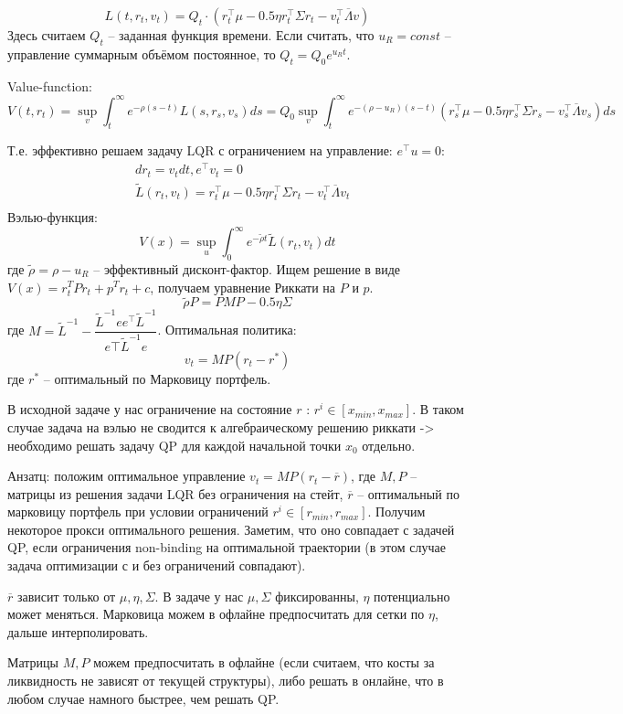 \documentclass[12pt,a4paper]{article}
\begin{document}
$$L(t, r_t, v_t) = Q_t \cdot 
\left( r_t^\top \mu - 0.5 \eta r_t^\top \Sigma r_t - v_t^\top \overline{\Lambda} v \right)$$
Здесь считаем $Q_t$ -- заданная функция времени. Если считать, что $u_R = const$ -- управление суммарным объёмом постоянное, то
$Q_t = Q_0 e^{u_R t}$. 

Value-function:
$$
    V(t, r_t) = \sup_{v} \int_t^\infty e^{-\rho(s-t)} L(s, r_s, v_s) ds
    = Q_0 \sup_{v} \int_t^\infty e^{-(\rho-u_R)(s-t)} \left( r_s^\top \mu - 0.5 \eta r_s^\top \Sigma r_s - v_s^\top \overline{\Lambda} v_s \right) ds
$$

Т.е. эффективно решаем задачу LQR с ограничением на управление: $e^\top u = 0$:
$$
\begin{aligned}
    &dr_t = v_t dt, e^\top v_t = 0 \\ 
    &\tilde{L}(r_t, v_t) = r_t^\top \mu - 0.5 \eta r_t^\top \Sigma r_t - v_t^\top \overline{\Lambda} v_t \\
\end{aligned}
$$
Вэлью-функция:
$$
    V(x) = \sup_u \int_0^\infty e^{-\tilde{\rho} t} \tilde{L}(r_t, v_t) dt
$$
где $\tilde{\rho} = \rho - u_R$ -- эффективный дисконт-фактор.
Ищем решение в виде $V(x) = r_t^T P r_t + p^T r_t + c$, получаем уравнение Риккати на $P$ и $p$.
$$
    \tilde{\rho} P = P M P - 0.5  \eta \Sigma
$$где $M = \tilde{L}^{-1} - \dfrac{\tilde{L}^{-1}ee^\top \tilde{L}^{-1}}{e\top \tilde{L}^{-1}e}$.
Оптимальная политика:
$$
    v_t = MP (r_t- r^*)
$$где $r^*$ -- оптимальный по Марковицу портфель.

В исходной задаче у нас ограничение на состояние $r$ : $r^i \in [x_{min}, x_{max}]$. 
В таком случае задача на вэлью не сводится к алгебраическому решению риккати -> необходимо решать задачу QP для каждой начальной точки $x_0$ отдельно.

Анзатц: положим оптимальное управление $v_t = MP (r_t - \overline{r})$,
где $M, P$ -- матрицы из решения задачи LQR без ограничения на стейт, $\overline{r}$ -- оптимальный по марковицу портфель при условии ограничений $r^i \in [r_{min}, r_{max}]$.
Получим некоторое прокси оптимального решения. Заметим, что оно совпадает с задачей QP, если ограничения non-binding на оптимальной траектории (в этом случае задача оптимизации с и без ограничений совпадают).

$\overline{r}$ зависит только от $\mu, \eta, \Sigma$. В задаче у нас $\mu, \Sigma$ фиксированны, $\eta$ потенциально может меняться.
Марковица можем в офлайне предпосчитать для сетки по $\eta$, дальше интерполировать.

Матрицы $M, P$ можем предпосчитать в офлайне (если считаем, что косты за ликвидность не зависят от текущей структуры), либо решать в онлайне, что в любом случае намного быстрее, чем решать QP.
\end{document}
